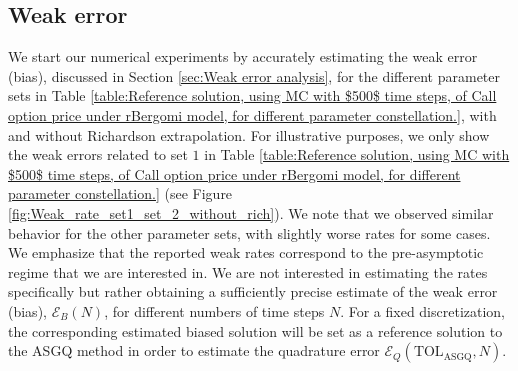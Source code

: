 \subsection{Weak error} \label{sec:Weak error plots_no_change}
We start our numerical experiments by accurately  estimating the weak error (bias), discussed in Section \ref{sec:Weak error analysis}, for the different parameter sets  in Table \ref{table:Reference solution, using MC with $500$ time steps, of Call option price under rBergomi model, for different parameter constellation.}, with and without Richardson extrapolation.   For illustrative purposes, we only show the weak errors related to set $1$ in Table \ref{table:Reference solution, using MC with $500$ time steps, of Call option price under rBergomi model, for different parameter constellation.} (see Figure \ref{fig:Weak_rate_set1_set_2_without_rich}). We note that we observed similar behavior for the other parameter sets, with slightly worse rates for some cases. We emphasize that the reported weak rates correspond to the pre-asymptotic regime that we are interested in. We are not interested in estimating the rates specifically but rather obtaining  a sufficiently precise estimate of the weak error (bias), $\mathcal{E}_B(N)$, for different  numbers of time steps $N$.  For a fixed discretization, the corresponding estimated biased solution will be set as a reference solution to the  ASGQ method  in order to estimate the quadrature error $\mathcal{E}_Q(\text{TOL}_{\text{ASGQ}},N)$.	
\FloatBarrier

